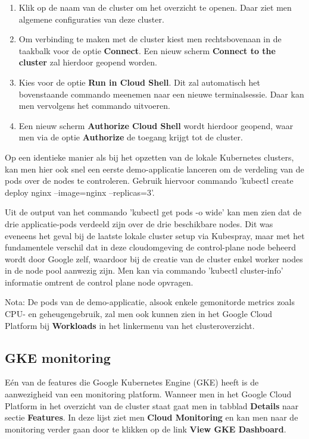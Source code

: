 \begin{enumerate}
\begin{enumerate}
    \end{enumerate}    
    \item Klik op de naam van de cluster om het overzicht te openen. Daar ziet men algemene configuraties van deze cluster.
    \item Om verbinding te maken met de cluster kiest men rechtsbovenaan in de taakbalk voor de optie {\bf Connect}. Een nieuw scherm {\bf Connect to the cluster} zal hierdoor geopend worden.
    \item Kies voor de optie {\bf Run in Cloud Shell}. Dit zal automatisch het bovenstaande commando meenemen naar een nieuwe terminalsessie. Daar kan men vervolgens het commando uitvoeren.
    \item Een nieuw scherm {\bf Authorize Cloud Shell} wordt hierdoor geopend, waar men via de optie {\bf Authorize} de toegang krijgt tot de cluster.   
\end{enumerate} 

Op een identieke manier als bij het opzetten van de lokale Kubernetes clusters, kan men hier ook snel een eerste demo-applicatie lanceren om de verdeling van de pods over de nodes te controleren. Gebruik hiervoor commando 'kubectl create deploy nginx --image=nginx --replicas=3'.

Uit de output van het commando 'kubectl get pods -o wide' kan men zien dat de drie applicatie-pods verdeeld zijn over de drie beschikbare nodes. Dit was eveneens het geval bij de laatste lokale cluster setup via Kubespray, maar met het fundamentele verschil dat in deze cloudomgeving de control-plane node beheerd wordt door Google zelf, waardoor bij de creatie van de cluster enkel worker nodes in de node pool aanwezig zijn. Men kan via commando 'kubectl cluster-info' informatie omtrent de control plane node opvragen. 

Nota: De pods van de demo-applicatie, alsook enkele gemonitorde metrics zoals CPU- en geheugengebruik, zal men ook kunnen zien in het Google Cloud Platform bij {\bf Workloads} in het linkermenu van het clusteroverzicht. 

\subsection{GKE monitoring}

Eén van de features die Google Kubernetes Engine (GKE) heeft is de aanwezigheid van een monitoring platform. Wanneer men in het Google Cloud Platform in het overzicht van de cluster staat gaat men in tabblad {\bf Details} naar sectie {\bf Features}. In deze lijst ziet men {\bf Cloud Monitoring } en kan men naar de monitoring verder gaan door te klikken op de link {\bf View GKE Dashboard}.

